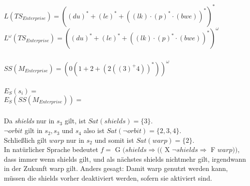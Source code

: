 \documentclass[a4paper,12pt]{scrartcl}
\title{\blatt}
\date{Gruppe 06}
\author{Sabrina Buczko 6663234, Julian Deinert 6535880, Rafael Heid 6704828}
\begin{document}
\maketitle
\newpage
\setcounter{section}{3}
\section{}
\setcounter{subsection}{2}
\subsection{}
\subsubsection{}
$L(TS_{Enterprise})= ((du)^*+(le)^*+((lk)\cdot (p)^*\cdot (bwe))^*)^*$\\
$L^\omega(TS_{Enterprise})=((du)^*+(le)^*+((lk)\cdot (p)^*\cdot (bwe))^*)^\omega$
\subsubsection{}
$SS(M_{Enterprise})=(0(1 + 2 + (2((3)^+ 4))^*))^\omega$\\

\subsubsection{}
$E_S(s_i)=$\\
$E_S(SS(M_{Enterprise}))=$
\subsubsection{}
Da \textit{shields} nur in $s_3$ gilt, ist $Sat(shields)=\{3\}$.\\
$\neg orbit$ gilt in $s_2, s_3$ und $s_4$ 
also ist $Sat(\neg{orbit})=\{2,3,4\}$.\\
Schließlich gilt $warp$ nur in $s_2$ und somit ist $Sat(warp)=\{2\}$.\\

In natürlicher Sprache bedeutet
$f=$ G $(shields \Rightarrow (($ X $ \neg{shields} \Rightarrow $ F $warp))$,
 dass immer wenn shields gilt, und als nächstes shields nichtmehr gilt, 
irgendwann in der Zukunft warp gilt. Anders gesagt: Damit warp genutzt 
werden kann, müssen die shields vorher deaktiviert werden, sofern sie 
aktiviert sind.
\subsubsection{}
\subsection{}
\end{document}
